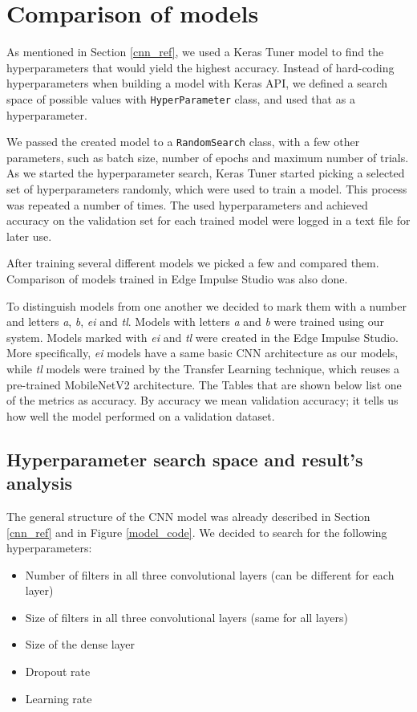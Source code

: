 \section{ Comparison of models}\label{model_comparisons}

As mentioned in Section \ref{cnn_ref}, we used a Keras Tuner model to find the hyperparameters that would yield the highest accuracy.
Instead of hard-coding hyperparameters when building a model with Keras API, we defined a search space of possible values with \verb|HyperParameter| class, and used that as a hyperparameter.

We passed the created model to a \verb|RandomSearch| class, with a few other parameters, such as batch size, number of epochs and maximum number of trials.
As we started the hyperparameter search, Keras Tuner started picking a selected set of hyperparameters randomly, which were used to train a model.
This process was repeated a number of times.
The used hyperparameters and achieved accuracy on the validation set for each trained model were logged in a text file for later use.

After training several different models we picked a few and compared them.
Comparison of models trained in Edge Impulse Studio was also done.

To distinguish models from one another we decided to mark them with a number and letters \textit{a}, \textit{b}, \textit{ei} and \textit{tl}.
Models with letters \textit{a} and \textit{b} were trained using our system.
Models marked with \textit{ei} and \textit{tl} were created in the Edge Impulse Studio.
More specifically, \textit{ei} models have a same basic CNN architecture as our models, while \textit{tl} models were trained by the Transfer Learning technique, which reuses a pre-trained MobileNetV2 architecture.
The Tables that are shown below list one of the metrics as accuracy.
By accuracy we mean validation accuracy; it tells us how well the model performed on a validation dataset.

\subsection{ Hyperparameter search space and result's analysis}

The general structure of the CNN model was already described in Section \ref{cnn_ref} and in Figure \ref{model_code}.
We decided to search for the following hyperparameters: 

\begin{itemize}
    \item Number of filters in all three convolutional layers (can be different for each layer)
    \item Size of filters in all three convolutional layers (same for all layers)
    \item Size of the dense layer
    \item Dropout rate 
    \item Learning rate
\end{itemize}

